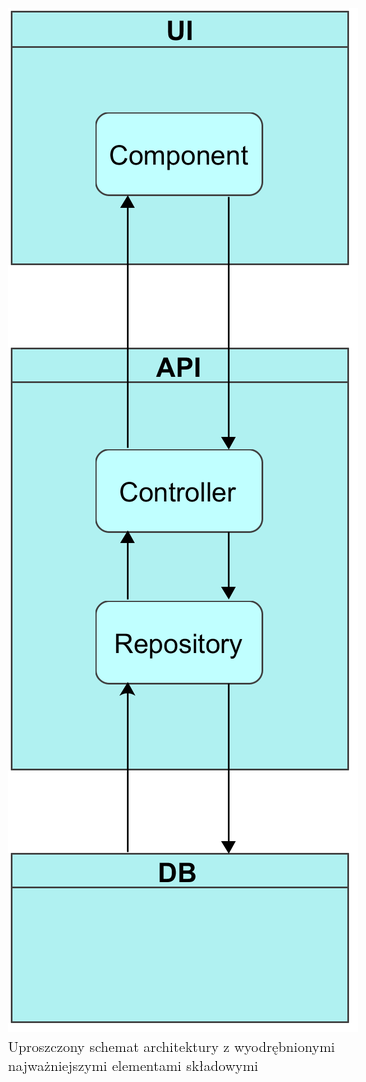 \documentclass[eng,printmode,openany]{mgr}
\begin{document}
	\begin{figure}[H]
		\centering
		\includegraphics[scale=0.2]{images/architecture.png}
		\caption{Uproszczony schemat architektury z wyodrębnionymi najważniejszymi elementami składowymi}
	\end{figure}
	
\end{document}

